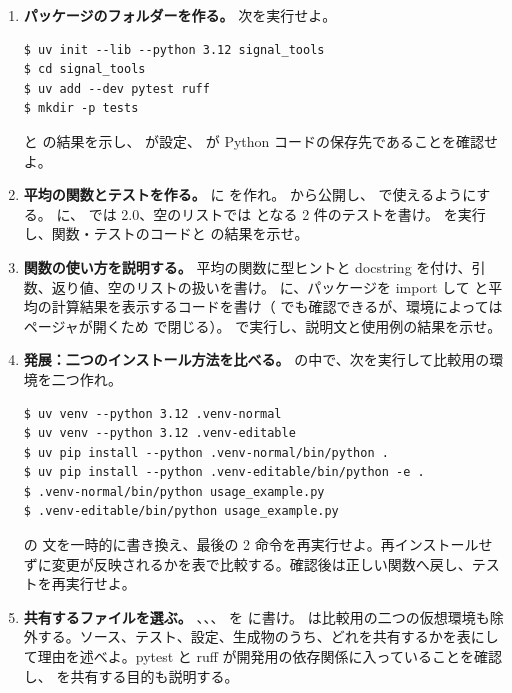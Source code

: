 \begin{enumerate}
\item \textbf{パッケージのフォルダーを作る。}
次を実行せよ。
\begin{lstlisting}[numbers=none, xleftmargin=2\zw]
$ uv init --lib --python 3.12 signal_tools
$ cd signal_tools
$ uv add --dev pytest ruff
$ mkdir -p tests
\end{lstlisting}
 と  の結果を示し、 が設定、 が Python コードの保存先であることを確認せよ。

\item \textbf{平均の関数とテストを作る。}
 に  を作れ。 から公開し、 で使えるようにする。 に、\code{[1.0, 2.0, 3.0]} では 2.0、空のリストでは  となる 2 件のテストを書け。 を実行し、関数・テストのコードと  の結果を示せ。

\item \textbf{関数の使い方を説明する。}
平均の関数に型ヒントと docstring を付け、引数、返り値、空のリストの扱いを書け。 に、パッケージを import して  と平均の計算結果を表示するコードを書け（ でも確認できるが、環境によってはページャが開くため  で閉じる）。 で実行し、説明文と使用例の結果を示せ。

\item \textbf{発展：二つのインストール方法を比べる。}
 の中で、次を実行して比較用の環境を二つ作れ。
\begin{lstlisting}[numbers=none, xleftmargin=2\zw]
$ uv venv --python 3.12 .venv-normal
$ uv venv --python 3.12 .venv-editable
$ uv pip install --python .venv-normal/bin/python .
$ uv pip install --python .venv-editable/bin/python -e .
$ .venv-normal/bin/python usage_example.py
$ .venv-editable/bin/python usage_example.py
\end{lstlisting}
 の  文を一時的に書き換え、最後の 2 命令を再実行せよ。再インストールせずに変更が反映されるかを表で比較する。確認後は正しい関数へ戻し、テストを再実行せよ。

\item \textbf{共有するファイルを選ぶ。}
、、、 を  に書け。 は比較用の二つの仮想環境も除外する。ソース、テスト、設定、生成物のうち、どれを共有するかを表にして理由を述べよ。pytest と ruff が開発用の依存関係に入っていることを確認し、 を共有する目的も説明する。

\end{enumerate}
